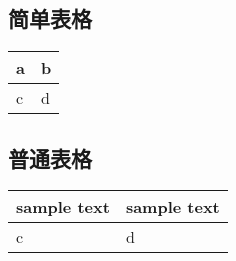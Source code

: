 \documentclass[UTF8]{ctexart}
\newenvironment{marktext}{}{}
\newlength\tablewidth
\begin{document}
\normalsize
\begin{marktext}


\subsection{简单表格}

\end{marktext}
\begin{center}
\setlength\tablewidth{\dimexpr (\textwidth -4\tabcolsep)}
\begin{tabular}{|p{0.500\tablewidth}<{\centering}|p{0.500\tablewidth}<{\centering}|}
\hline
\rowcolor{tabletopgray}
\textbf{a}&\textbf{b}\\
\hline
c&d\\
\hline
\end{tabular}
\end{center}
\begin{marktext}


\subsection{普通表格}


\end{marktext}
\begin{center}
\setlength\tablewidth{\dimexpr (\textwidth -4\tabcolsep)}
\begin{tabular}{|p{0.500\tablewidth}<{\centering}|p{0.500\tablewidth}<{\centering}|}
\hline
\rowcolor{tabletopgray}
\textbf{sample text }&\textbf{ sample text}\\
\hline
c&d\\
\hline
\end{tabular}
\end{center}
\end{document}
